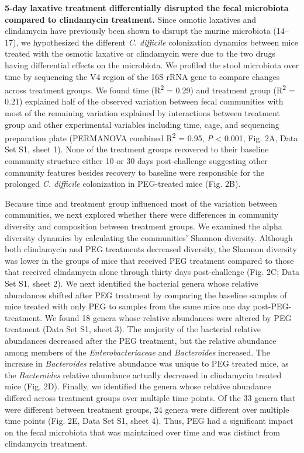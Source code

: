 \documentclass[
  11pt,
]{article}
\begin{document}
\textbf{5-day laxative treatment differentially disrupted the fecal
microbiota compared to clindamycin treatment.} Since osmotic laxatives
and clindamycin have previously been shown to disrupt the murine
microbiota (14--17), we hypothesized the different \emph{C. difficile}
colonization dynamics between mice treated with the osmotic laxative or
clindamycin were due to the two drugs having differential effects on the
microbiota. We profiled the stool microbiota over time by sequencing the
V4 region of the 16S rRNA gene to compare changes across treatment
groups. We found time (R\textsuperscript{2} = 0.29) and treatment group
(R\textsuperscript{2} = 0.21) explained half of the observed variation
between fecal communities with most of the remaining variation explained
by interactions between treatment group and other experimental variables
including time, cage, and sequencing preparation plate (PERMANOVA
combined R\textsuperscript{2} = 0.95, \emph{P} \textless{} 0.001, Fig.
2A, Data Set S1, sheet 1). None of the treatment groups recovered to
their baseline community structure either 10 or 30 days post-challenge
suggesting other community features besides recovery to baseline were
responsible for the prolonged \emph{C. difficile} colonization in
PEG-treated mice (Fig. 2B).

Because time and treatment group influenced most of the variation
between communities, we next explored whether there were differences in
community diversity and composition between treatment groups. We
examined the alpha diversity dynamics by calculating the communities'
Shannon diversity. Although both clindamycin and PEG treatments
decreased diversity, the Shannon diversity was lower in the groups of
mice that received PEG treatment compared to those that received
clindamycin alone through thirty days post-challenge (Fig. 2C; Data Set
S1, sheet 2). We next identified the bacterial genera whose relative
abundances shifted after PEG treatment by comparing the baseline samples
of mice treated with only PEG to samples from the same mice one day
post-PEG-treatment. We found 18 genera whose relative abundances were
altered by PEG treatment (Data Set S1, sheet 3). The majority of the
bacterial relative abundances decreased after the PEG treatment, but the
relative abundance among members of the \emph{Enterobacteriaceae} and
\emph{Bacteroides} increased. The increase in \emph{Bacteroides}
relative abundance was unique to PEG treated mice, as the
\emph{Bacteroides} relative abundance actually decreased in clindamycin
treated mice (Fig. 2D). Finally, we identified the genera whose relative
abundance differed across treatment groups over multiple time points. Of
the 33 genera that were different between treatment groups, 24 genera
were different over multiple time points (Fig. 2E, Data Set S1, sheet
4). Thus, PEG had a significant impact on the fecal microbiota that was
maintained over time and was distinct from clindamycin treatment.
\end{document}
